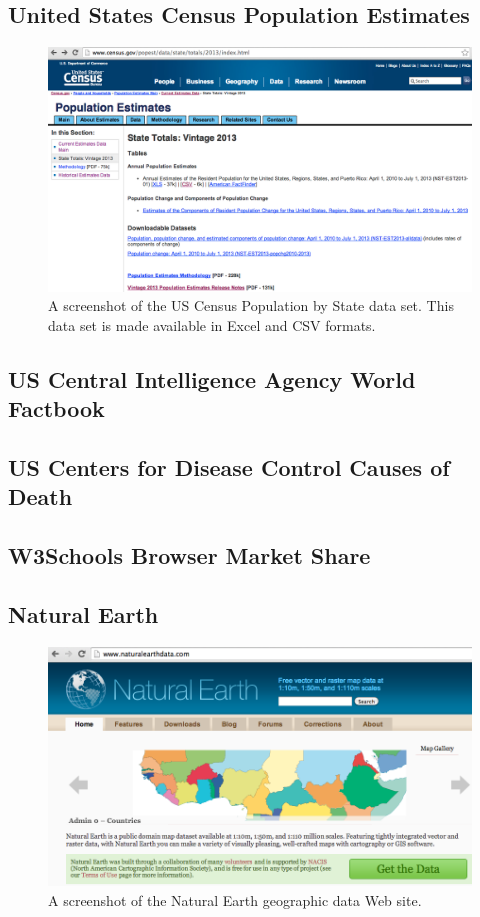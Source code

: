 \subsection{United States Census Population Estimates}
\begin{figure}[h]
  \caption{A screenshot of the US Census Population by State data set. This data set is made available in Excel and CSV formats.}
  \centering
  \includegraphics[width=\textwidth]{figures/usCensusPopulationByState.png}
\end{figure}

\subsection{US Central Intelligence Agency World Factbook}
\subsection{US Centers for Disease Control Causes of Death}
\subsection{W3Schools Browser Market Share}
\subsection{Natural Earth}
\begin{figure}[h]
  \caption{A screenshot of the Natural Earth geographic data Web site.}
  \centering
  \includegraphics[width=\textwidth]{figures/naturalEarth.png}
\end{figure}
